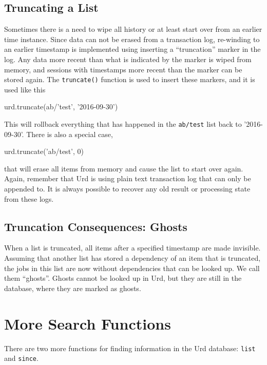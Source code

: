 \subsection{Truncating a List}
Sometimes there is a need to wipe all history or at least start over
from an earlier time instance.  Since data can not be erased from a
transaction log, re-winding to an earlier timestamp is implemented
using inserting a ``truncation'' marker in the log.  Any data more
recent than what is indicated by the marker is wiped from memory, and
sessions with timestamps more recent than the marker can be stored
again.  The \texttt{truncate()} function is used to insert these
markers, and it is used like this
\begin{python}
urd.truncate(ab/'test', '2016-09-30')
\end{python}
This will rollback everything that has happened in
the \texttt{ab/test} list back to '2016-09-30'.  There is also a
special case,
\begin{python}
urd.truncate('ab/test', 0)
\end{python}
that will erase all items from memory and cause the list to start over
again.  Again, remember that Urd is using plain text transaction log
that can only be appended to.  It is always possible to recover any
old result or processing state from these logs.



\subsection{Truncation Consequences:  Ghosts}
When a list is truncated, all items after a specified timestamp are
made invisible.  Assuming that another list has stored a dependency of
an item that is truncated, the jobs in this list are now without
dependencies that can be looked up.  We call them ``ghosts''.  Ghosts
cannot be looked up in Urd, but they are still in the database, where
they are marked as ghosts.





\section{More Search Functions}
\label{sec:more_urd_search}

There are two more functions for finding information in the Urd
database: \texttt{list} and \texttt{since}.



